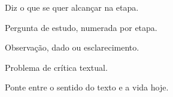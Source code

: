 \begin{objetivo}Diz o que se quer alcançar na etapa.\end{objetivo}
\begin{pergunta}Pergunta de estudo, numerada por etapa.\end{pergunta}
\begin{nota}Observação, dado ou esclarecimento.\end{nota}
\begin{variante}Problema de crítica textual.\end{variante}
\begin{aplicacao}Ponte entre o sentido do texto e a vida hoje.\end{aplicacao}


